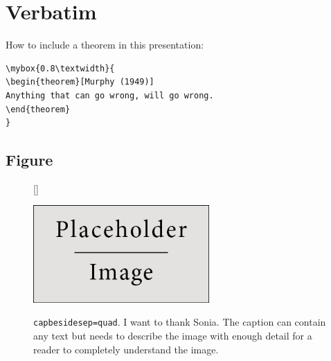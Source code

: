 \documentclass[
paper=landscape,
paper=160mm:90mm, %
fontsize=11pt, %
pagesize, %
parskip=half-, %
]{scrartcl} %
\theoremstyle{mythmstyle} %
\newtheorem{theorem}{Theorem}[section] %
\newcommand*{\mybox}[2]{%
  \par\noindent
  \begin{tikzpicture}[mynodestyle/.style={rectangle,draw=myblue,thick,inner sep=2mm,text justified,top color=white,bottom color=white,above}]
    \node[mynodestyle,at={(0.5*#1+2mm+0.4pt,0)}]{%
      \begin{minipage}[t]{#1}
      #2
      \end{minipage}%
    };
  \end{tikzpicture}
\par\vspace{-1.3em}}
\begin{document}






\section*{Verbatim}

How to include a theorem in this presentation:
\begin{verbatim}
\mybox{0.8\textwidth}{
\begin{theorem}[Murphy (1949)]
Anything that can go wrong, will go wrong.
\end{theorem}
}
\end{verbatim}

\clearpage




\subsection*{Figure}


\begin{figure}[ht]
[\FBwidth]
{\caption{\texttt{capbesidesep=quad}. I want to thank Sonia. The caption can contain any text but needs to describe the image with enough detail for a reader to completely understand the image.}}
{\includegraphics[width=0.6\textwidth]{placeholder.jpg}}
\end{figure}

\end{document}
